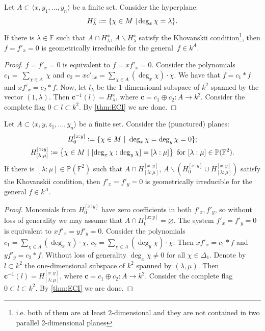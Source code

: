 \begin{example}
    Let $A  \subset  \langle x, y_1, \dots, y_n \rangle$ be a finite set. Consider the hyperplane: 
    \[
    H^x_\lambda \vcentcolon= \{ \chi \in M\ | \deg_x \chi = \lambda \}.
    \]
    If there is $\lambda \in \mathbb F$ such that $A \cap H^x_\lambda$, $A \backslash H^x_\lambda$ satisfy the Khovanskii condition\footnote{i.e. both of them are at least 2-dimensional and they are not contained in two parallel 2-dimensional planes}, then $f = f'_x = 0$ is geometrically irreducible for the general~$f \in k^A$.
\end{example}
\begin{proof}
    $f = f'_x = 0$ is equivalent to $f = xf'_x = 0$. Consider the polynomials $c_1 = ~\sum_{\chi \in A} ~\chi$ and $c_2 = x c'_{1x} = \sum_{\chi \in A} (\deg_x \chi) \cdot \chi$. We have that $f = c_1 * f$ and $x f'_x = c_2 * f$.
    Now, let $l_\lambda$ be the 1-dimensional subspace of $k^2$ spanned by the vector $(1, \lambda)$. Then $\mathbf c^{-1} (l) = H^x_\lambda$, where $\mathbf c = c_1 \oplus c_2: A \to k^2$. Consider the complete flag $0 \subset l \subset k^2$. By \autoref{thm:ECI} we are done.
\end{proof}

\begin{example}
Let $A \subset \langle x, y, z_1, \dots, y_n \rangle$ be a finite set. Consider the (punctured) planes:
\begin{gather*}
    H^{[x : y]}_0 \vcentcolon= \{ \chi \in M\ |\ \deg_x \chi = \deg_y \chi = 0\}; \\
    H^{[x: y]}_{[\lambda : \mu]} \vcentcolon= \left\{\chi \in M\ |\ [\deg_x \chi : \deg_y \chi] = [\lambda : \mu ] \right\} \text{ for } [\lambda : \mu] \in \mathbb P(\mathbb F^2).
\end{gather*}
If there is $[\lambda : \mu] \in \mathbb P(\mathbb F^2)$ such that $A \cap H^{[x: y]}_{[\lambda : \mu]}$, $A \backslash (H^{[x:y]}_0 \cup H^{[x: y]}_{[\lambda : \mu]})$ satisfy the Khovanskii condition,
then $f'_x = f'_y = 0$ is geometrically irreducible for the general $f \in k^A$.
\end{example}
\begin{proof}
    Monomials from $H^{[x: y]}_0$ have zero coefficients in both $f'_x, f'_y$, so without loss of generality we may assume that $A \cap H^{[x: y]}_0 = \varnothing$. The system $f'_x = f'_y = 0$ is equivalent to $xf'_x = yf'_y = 0$. Consider the polynomials $c_1 = \sum_{\chi \in A} (\deg_x \chi) \cdot \chi$, $c_2 = \sum_{\chi \in A} (\deg_y \chi) \cdot \chi$.
    Then $xf'_x = c_1 * f$ and $y f'_y = c_2 * f$. Without loss of generality $\deg_x \chi \ne 0$ for all $\chi \in \Delta_1$. Denote by $l \subset k^2$ the one-dimensional subspace of $k^2$ spanned by $(\lambda, \mu)$. Then $\mathbf c^{-1} (l) = H^{[x: y]}_{[\lambda: \mu]}$, where $\mathbf c = c_1 \oplus c_2: A \to k^2$. Consider the complete flag $0 \subset l \subset k^2$. By \autoref{thm:ECI} we are done.
\end{proof}

